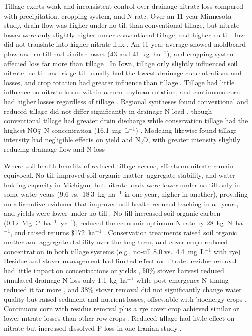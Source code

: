 \documentclass[11pt]{article}
\begin{document}
Tillage exerts weak and inconsistent control over drainage nitrate loss compared with precipitation, cropping system, and N rate. Over an 11-year Minnesota study, drain flow was higher under no-till than conventional tillage, but nitrate losses were only slightly higher under conventional tillage, and higher no-till flow did not translate into higher nitrate flux \parencite{RANDALL1995}. An 11-year average showed moldboard plow and no-till had similar losses (43 and 41~kg~ha$^{-1}$), and cropping system affected loss far more than tillage \parencite{Randall2001}. In Iowa, tillage only slightly influenced soil nitrate, no-till and ridge-till usually had the lowest drainage concentrations and losses, and crop rotation had greater influence than tillage \parencite{Weed1996}. Tillage had little influence on nitrate losses within a corn--soybean rotation, and continuous corn had higher losses regardless of tillage \parencite{Kanwar1997}. Regional syntheses found conventional and reduced tillage did not differ significantly in drainage N load \parencite{Zhao2016}, though conventional tillage had greater drain discharge while conservation tillage had the highest NO$_3^-$-N concentration (16.1~mg~L$^{-1}$) \parencite{Hertzberger2019}. Modeling likewise found tillage intensity had negligible effects on yield and N$_2$O, with greater intensity slightly reducing drainage flow and N loss \parencite{Wang2016b}.

Where soil-health benefits of reduced tillage accrue, effects on nitrate remain equivocal. No-till improved soil organic matter, aggregate stability, and water-holding capacity in Michigan, but nitrate loads were lower under no-till only in some water years (9.6 vs.\ 18.3~kg~ha$^{-1}$ in one year, higher in another), providing no affirmative evidence that improved soil health reduced leaching in all years, and yields were lower under no-till \parencite{Masri2024}. No-till increased soil organic carbon (0.12~Mg~C~ha$^{-1}$~yr$^{-1}$), reduced the economic optimum N rate by 28~kg~N~ha$^{-1}$, and raised returns \$172~ha$^{-1}$ \parencite{Cassman2025}. Conservation treatments raised soil organic matter and aggregate stability over the long term, and cover crops reduced concentration in both tillage systems (e.g., no-till 8.0 vs.\ 4.4~mg~L$^{-1}$ with rye) \parencite{Waring2024}. Residue and stover management had limited effect on nitrate: residue removal had little impact on concentrations or yields \parencite{Dougherty2020}, 50\% stover harvest reduced simulated drainage N loss only 1.1~kg~ha$^{-1}$ while post-emergence N timing reduced it far more \parencite{Malone2019}, and 38\% stover removal did not significantly change water quality but raised sediment and nutrient losses, offsettable with bioenergy crops \parencite{Guo2018}. Continuous corn with residue removal plus a rye cover crop achieved similar or lower nitrate losses than other row crops \parencite{Daigh2015b}. Reduced tillage had little effect on nitrate but increased dissolved-P loss in one Iranian study \parencite{Farahani2020}.
\end{document}

